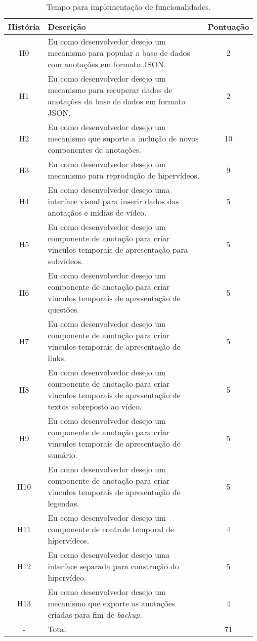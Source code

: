\begin{table}[h!]
	\centering
	\begin{tabular}{| c | p{9cm} | c |}
		\hline
		História & Descrição & Pontuação \\
		\hline
		\hline
		H0 & Eu como desenvolvedor desejo um mecanismo para popular a base de dados com anotações em formato JSON. & 2 \\
		\hline
		H1 & Eu como desenvolvedor desejo um mecanismo para recuperar dados de anotações da base de dados em formato JSON. & 2 \\
		\hline
		H2 & Eu como desenvolvedor desejo um mecanismo que suporte a inclução de novos componentes de anotações. & 10 \\
		\hline
		H3 & Eu como desenvolvedor desejo um mecanismo para reprodução de hipervídeos. & 9 \\
		\hline		
		H4 & Eu como desenvolvedor desejo uma interface visual para inserir dados das anotaçãos e mídias de vídeo. & 5 \\
		\hline
		H5 & Eu como desenvolvedor desejo um componente de anotação para criar vinculos temporais de apresentação para subvídeos. & 5 \\
		\hline
		H6 & Eu como desenvolvedor desejo um componente de anotação para criar vinculos temporais de apresentação de questões. & 5 \\
		\hline		
		H7 & Eu como desenvolvedor desejo um componente de anotação para criar vinculos temporais de apresentação de links. & 5 \\
		\hline
		H8 & Eu como desenvolvedor desejo um componente de anotação para criar vinculos temporais de apresentação de textos sobreposto ao vídeo. & 5 \\
		\hline
		H9 & Eu como desenvolvedor desejo um componente de anotação para criar vinculos temporais de apresentação de sumário. & 5 \\
		\hline
		H10 & Eu como desenvolvedor desejo um componente de anotação para criar vinculos temporais de apresentação de legendas. & 5 \\
		\hline		
		H11 & Eu como desenvolvedor desejo um componente de controle temporal de hipervídeos. & 4 \\
		\hline
		H12 & Eu como desenvolvedor desejo uma interface separada para construção do hipervídeo. & 5 \\
		\hline
		H13 & Eu como desenvolvedor desejo um mecanismo que exporte as anotações criadas para fim de \textit{backup.} & 4 \\
		\hline
		\hline		
		- & Total & 71 \\
		\hline		
	\end{tabular}
	\caption{Tempo para implementação de funcionalidades.}
	\label{tab:tempo}
\end{table}

